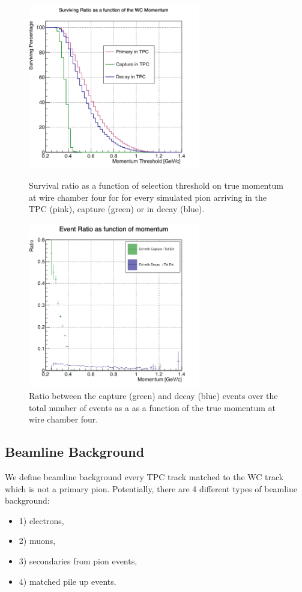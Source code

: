 \begin{figure}[p]
\centering
\begin{minipage}[t]{0.45\textwidth}
\centering
\includegraphics[width=7.5cm]{Chapter-7/Images/CDThreshold.png}
\caption{Survival ratio as a function of selection threshold on true momentum at wire chamber four for for every simulated pion arriving in the TPC (pink), capture (green) or in decay (blue).   }
\label{fig:survRatio}
\end{minipage}\hfill
\begin{minipage}[t]{0.45\textwidth}
\centering
\includegraphics[width=7.5cm]{Chapter-7/Images/CDRatio.png}
\caption{Ratio between the capture (green) and decay (blue) events over the total number of events as a as a function of the true momentum at wire chamber four.}
\label{fig:evtRatio}
\end{minipage}
\end{figure}

\clearpage
\subsection{Beamline Background}\label{ch:PionXSBkgSub2}
We define beamline background every TPC track matched to the WC track which is not a primary pion. Potentially, there are 4 different types of beamline background:
\begin{itemize}
\item[]1) electrons,
\item[]2) muons,
\item[]3) secondaries from pion events,
\item[]4) matched pile up events.
\end{itemize}


